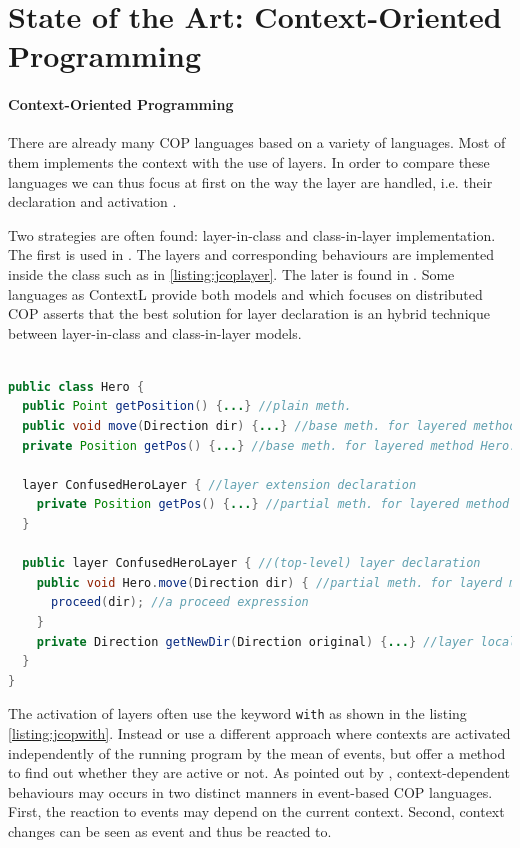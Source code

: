 \documentclass[a4paper]{article}
\begin{document}
\section{State of the Art: Context-Oriented Programming}
\label{section:stateoftheart}

\paragraph{Context-Oriented Programming}
There are already many COP languages based on a variety of languages. Most of them implements the context with the use of layers. In order to compare these languages we can thus focus at first on the way the layer are handled, i.e. their declaration and activation \cite{appeltauer_comparison_2009}.

Two strategies are often found: layer-in-class and class-in-layer implementation. The first is used in \cite{appeltauer_declarative_2012} \cite{appeltauer_dedicated_2008} \cite{appeltauer_improving_2009} \cite{kamina_eventcj:_2011} \cite{nunez_declarative_2009}. The layers and corresponding behaviours are implemented inside the class such as in \ref{listing:jcoplayer}. The later is found in \cite{lincke_open_2011}. Some languages as ContextL provide both models and \cite{ghezzi_context_2010} which focuses on distributed COP asserts that the best solution for layer declaration is an hybrid technique between layer-in-class and class-in-layer models. 

\begin{lstlisting}[float, language=Java, caption=JCop layer example, label={listing:jcoplayer}]

public class Hero {
  public Point getPosition() {...} //plain meth.
  public void move(Direction dir) {...} //base meth. for layered method Hero.move
  private Position getPos() {...} //base meth. for layered method Hero.getPos
  
  layer ConfusedHeroLayer { //layer extension declaration
    private Position getPos() {...} //partial meth. for layered method Hero.getPos
  }

  public layer ConfusedHeroLayer { //(top-level) layer declaration
    public void Hero.move(Direction dir) { //partial meth. for layerd meth. Hero.move
      proceed(dir); //a proceed expression
    }
    private Direction getNewDir(Direction original) {...} //layer local method
  }
}
\end{lstlisting}

The activation of layers often use the keyword \lstinline|with| \cite{haupt_contextj:_2011} \cite{appeltauer_declarative_2013} \cite{kamina_eventcj:_2011} as shown in the listing \ref{listing:jcopwith}. Instead \cite{nunez_declarative_2009} or \cite{ghezzi_context_2010} use a different approach where contexts are activated independently of the running program by the mean of events, but offer a method to find out whether they are active or not. As pointed out by \cite{nunez_declarative_2009}, context-dependent behaviours may occurs in two distinct manners in event-based COP languages. First, the reaction to events may depend on the current context. Second, context changes can be seen as event and thus be reacted to. 
\end{document}
